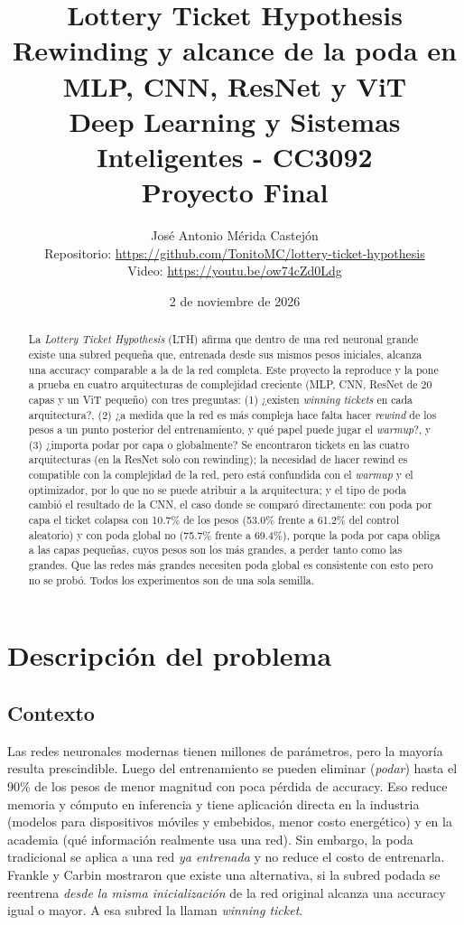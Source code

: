 \documentclass[11pt]{article}
\title{\textbf{Lottery Ticket Hypothesis}\\[0.4em]
  \textbf{\large Rewinding y alcance de la poda en MLP, CNN, ResNet y ViT}\\[1.2em]
  \large Deep Learning y Sistemas Inteligentes - CC3092\\[0.3em]
  \large Proyecto Final}
\author{José Antonio Mérida Castejón\\[0.4em]
  \small Repositorio: \url{https://github.com/TonitoMC/lottery-ticket-hypothesis}\\
  \small Video: \url{https://youtu.be/ow74cZd0Ldg}}
\date{2 de noviembre de 2026}
\begin{document}
\maketitle

\begin{abstract}
La \textit{Lottery Ticket Hypothesis} (LTH) afirma que dentro de una red neuronal grande existe una subred pequeña que, entrenada desde sus mismos pesos iniciales, alcanza una accuracy comparable a la de la red completa. Este proyecto la reproduce y la pone a prueba en cuatro arquitecturas de complejidad creciente (MLP, CNN, ResNet de 20 capas y un ViT pequeño) con tres preguntas: (1) ¿existen \textit{winning tickets} en cada arquitectura?, (2) ¿a medida que la red es más compleja hace falta hacer \textit{rewind} de los pesos a un punto posterior del entrenamiento, y qué papel puede jugar el \textit{warmup}?, y (3) ¿importa podar por capa o globalmente? Se encontraron tickets en las cuatro arquitecturas (en la ResNet solo con rewinding); la necesidad de hacer rewind es compatible con la complejidad de la red, pero está confundida con el \textit{warmup} y el optimizador, por lo que no se puede atribuir a la arquitectura; y el tipo de poda cambió el resultado de la CNN, el caso donde se comparó directamente: con poda por capa el ticket colapsa con 10.7\% de los pesos (53.0\% frente a 61.2\% del control aleatorio) y con poda global no (75.7\% frente a 69.4\%), porque la poda por capa obliga a las capas pequeñas, cuyos pesos son los más grandes, a perder tanto como las grandes. Que las redes más grandes necesiten poda global es consistente con esto pero no se probó. Todos los experimentos son de una sola semilla.
\end{abstract}

\newpage
\tableofcontents
\newpage

\section{Descripción del problema}
\subsection{Contexto}
Las redes neuronales modernas tienen millones de parámetros, pero la mayoría resulta prescindible. Luego del entrenamiento se pueden eliminar (\textit{podar}) hasta el 90\% de los pesos de menor magnitud con poca pérdida de accuracy. Eso reduce memoria y cómputo en inferencia y tiene aplicación directa en la industria (modelos para dispositivos móviles y embebidos, menor costo energético) y en la academia (qué información realmente usa una red). Sin embargo, la poda tradicional se aplica a una red \textit{ya entrenada} y no reduce el costo de entrenarla. Frankle y Carbin \cite{frankle2019lth} mostraron que existe una alternativa, si la subred podada se reentrena \textit{desde la misma inicialización} de la red original alcanza una accuracy igual o mayor. A esa subred la llaman \textit{winning ticket}.
\end{document}
